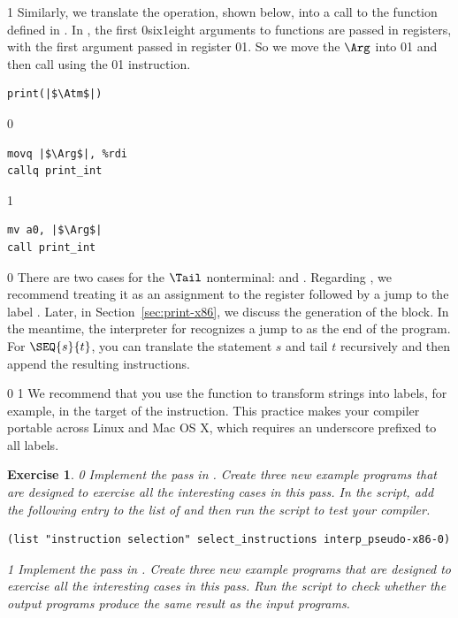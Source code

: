 \documentclass[7x10]{TimesAPriori_MIT}%
\def\racketEd{0}
\def\pythonEd{1}
\def\edition{1}
\def\xeightysixEd{0}
\def\riscvEd{1}
\def\architecture{1}
\newcommand\ifriscv[1]{\if\architecture\riscvEd{#1}\fi}
\newcommand\ifxeightsix[1]{\if\architecture\xeightysixEd{#1}\fi}
\newcommand{\pythonColor}[0]{}
\newtheorem{exercise}[theorem]{Exercise}
\numberwithin{theorem}{chapter}
\numberwithin{definition}{chapter}
\numberwithin{equation}{chapter}
\begin{document}
{\if\edition\pythonEd\pythonColor
%
Similarly, we translate the  operation, shown below, into
a call to the  function defined in .
In {\ArchName}, the first \ifxeightsix{six}\ifriscv{eight} arguments to functions are passed in registers,
with the first argument passed in register \ifxeightsix{}\ifriscv{}. So we move the
$\Arg$ into \ifxeightsix{}\ifriscv{} and then call  using the
\ifxeightsix{}\ifriscv{} instruction.
\begin{transformation}
\begin{lstlisting}
print(|$\Atm$|)    
\end{lstlisting}
\compilesto
\if\architecture\xeightysixEd
\begin{lstlisting}
movq |$\Arg$|, %rdi
callq print_int  
\end{lstlisting}
\fi
\if\architecture\riscvEd
\begin{lstlisting}
mv a0, |$\Arg$|
call print_int  
\end{lstlisting}
\fi
\end{transformation}
%
\fi}  

{\if\edition\racketEd
%
There are two cases for the $\Tail$ nonterminal:  and
. Regarding , we recommend treating it as an
assignment to the  register followed by a jump to
the label . Later, in Section~\ref{sec:print-x86},
we discuss the generation of the  block.
In the meantime, the interpreter for \LangXVar{} recognizes a jump
to  as the end of the program.
For $\SEQ{s}{t}$, you can translate the statement $s$ and tail $t$
recursively and then append the resulting instructions.
%
\fi}

\if\architecture\xeightysixEd
{\if\edition\pythonEd\pythonColor
We recommend that you use the function  to
transform strings into labels, for example, in
the target of the  instruction. This practice makes your
compiler portable across Linux and Mac OS X, which requires an underscore
prefixed to all labels.
\fi}
\fi
\begin{exercise}
  \normalfont\normalsize
{\if\edition\racketEd
Implement the  pass in
. Create three new example programs that are
designed to exercise all the interesting cases in this pass.
%
In the  script, add the following entry to the
list of  and then run the script to test your compiler.
\begin{lstlisting}
(list "instruction selection" select_instructions interp_pseudo-x86-0)
\end{lstlisting}
\fi}
{\if\edition\pythonEd\pythonColor
Implement the  pass in
. Create three new example programs that are
designed to exercise all the interesting cases in this pass.
Run the  script to check
whether the output programs produce the same result as the input
programs.
\fi}
\end{exercise}
\end{document}
